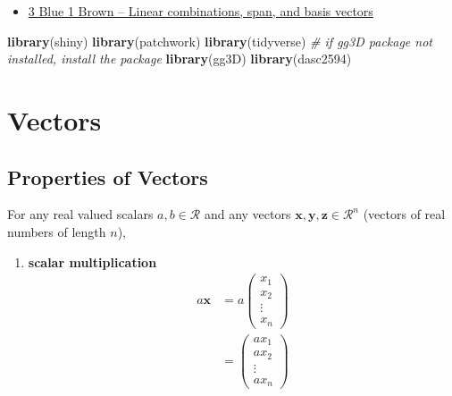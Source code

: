 \documentclass[
]{book}
\newenvironment{Shaded}{\begin{snugshade}}{\end{snugshade}}
\newcommand{\CommentTok}[1]{\textcolor[rgb]{0.56,0.35,0.01}{\textit{#1}}}
\newcommand{\KeywordTok}[1]{\textcolor[rgb]{0.13,0.29,0.53}{\textbf{#1}}}
\newcommand{\NormalTok}[1]{#1}
\providecommand{\tightlist}{%
  \setlength{\itemsep}{0pt}\setlength{\parskip}{0pt}}
\theoremstyle{definition}
\theoremstyle{definition}
\theoremstyle{definition}
\theoremstyle{remark}
\begin{document}
\begin{itemize}
\tightlist
\item
  \href{https://www.3blue1brown.com/lessons/span}{3 Blue 1 Brown -- Linear combinations, span, and basis vectors}
\end{itemize}

\begin{Shaded}
\begin{Highlighting}[]
\KeywordTok{library}\NormalTok{(shiny)}
\KeywordTok{library}\NormalTok{(patchwork)}
\KeywordTok{library}\NormalTok{(tidyverse)}
\CommentTok{# if gg3D package not installed, install the package}
\KeywordTok{library}\NormalTok{(gg3D)}
\KeywordTok{library}\NormalTok{(dasc2594)}
\end{Highlighting}
\end{Shaded}

\hypertarget{vectors}{%
\section{Vectors}\label{vectors}}

\hypertarget{properties-of-vectors}{%
\subsection{Properties of Vectors}\label{properties-of-vectors}}

For any real valued scalars \(a, b \in \mathcal{R}\) and any vectors \(\mathbf{x}, \mathbf{y}, \mathbf{z} \in \mathcal{R}^n\) (vectors of real numbers of length \(n\)),

\begin{enumerate}
\def\labelenumi{\arabic{enumi})}
\tightlist
\item
  \textbf{scalar multiplication}
  \[
  \begin{aligned}
  a \mathbf{x} & = a \begin{pmatrix} x_1 \\ x_2 \\ \vdots \\ x_n \end{pmatrix} \\
  & = \begin{pmatrix} a x_1 \\ a x_2 \\ \vdots \\ a x_n \end{pmatrix} 
  \end{aligned}
  \]
\end{enumerate}
\end{document}
